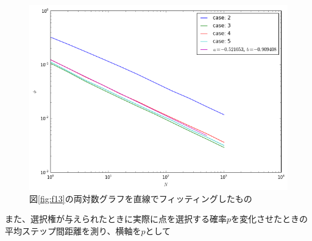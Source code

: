 \begin{figure}[H]
    \begin{center}
        \includegraphics[width=12.5cm]{../img/simple3_N_2_fit.png}
        \caption{図\ref{fig:f13}の両対数グラフを直線でフィッティングしたもの}
        \label{fig:f14}
    \end{center}
\end{figure}

また、選択権が与えられたときに実際に点を選択する確率$p$を変化させたときの平均ステップ間距離を測り、横軸を$p$として
